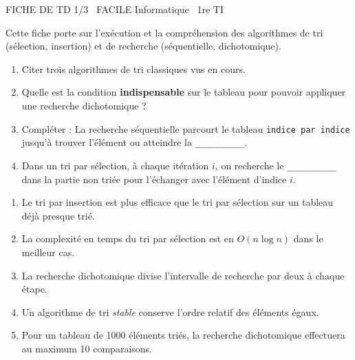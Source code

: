 \documentclass[11pt]{article}
\begin{document}
\begin{tcolorbox}[enhanced,colback=popink,colframe=popink,arc=10pt,boxrule=0pt,left=12pt,right=12pt,top=9pt,bottom=9pt]
{\color{white}\popxbold\small FICHE DE TD 1/3 \textbullet\ FACILE \hfill Informatique \textbullet\ 1re TI\par}
\end{tcolorbox}
\vspace{4pt}
Cette fiche porte sur l'exécution et la compréhension des algorithmes de tri (sélection, insertion) et de recherche (séquentielle, dichotomique).

\begin{exercice}
\begin{enumerate}
    \item Citer trois algorithmes de tri classiques vus en cours.
    \item Quelle est la condition \textbf{indispensable} sur le tableau pour pouvoir appliquer une recherche dichotomique ?
    \item Compléter : La recherche séquentielle parcourt le tableau \texttt{indice par indice} jusqu'à trouver l'élément ou atteindre la \texttt{\_\_\_\_\_\_\_\_\_\_}.
    \item Dans un tri par sélection, à chaque itération $i$, on recherche le \texttt{\_\_\_\_\_\_\_\_\_\_} dans la partie non triée pour l'échanger avec l'élément d'indice $i$.
\end{enumerate}
\end{exercice}

\begin{exercice}
\begin{enumerate}
    \item Le tri par insertion est plus efficace que le tri par sélection sur un tableau déjà presque trié.
    \item La complexité en temps du tri par sélection est en $O(n \log n)$ dans le meilleur cas.
    \item La recherche dichotomique divise l'intervalle de recherche par deux à chaque étape.
    \item Un algorithme de tri \textit{stable} conserve l'ordre relatif des éléments égaux.
    \item Pour un tableau de 1000 éléments triés, la recherche dichotomique effectuera au maximum 10 comparaisons.
\end{enumerate}
\end{exercice}
\end{document}
